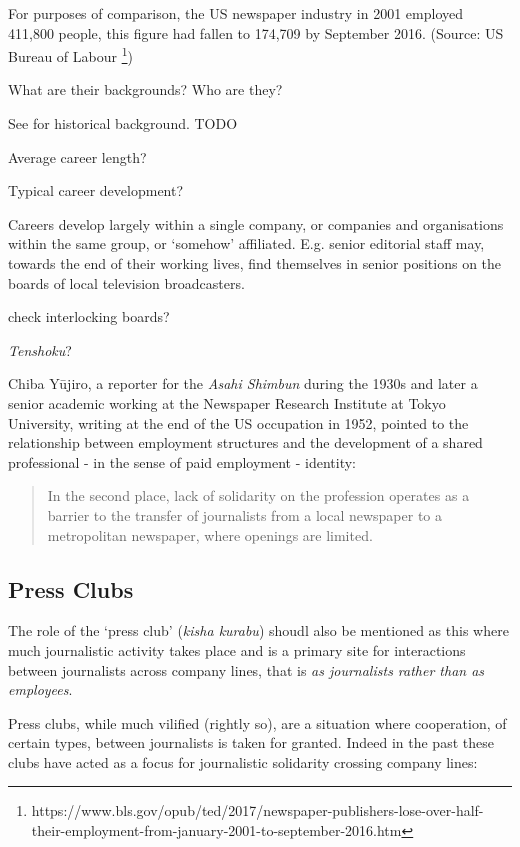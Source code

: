 \documentclass[11pt, headings=normal]{scrartcl}
\begin{document}
For purposes of comparison, the US newspaper industry in 2001 employed
411,800 people, this figure had fallen to 174,709 by September 2016.
(Source: US Bureau of Labour \footnote{https://www.bls.gov/opub/ted/2017/newspaper-publishers-lose-over-half-their-employment-from-january-2001-to-september-2016.htm})

What are their backgrounds? Who are they?

See \textcite{Kawasaki:2006} for historical background. {TODO}

Average career length?

Typical career development?

Careers develop largely within a single company, or companies and
organisations within the same group, or `somehow' affiliated. E.g.
senior editorial staff may, towards the end of their working lives, find
themselves in senior positions on the boards of local television
broadcasters.

{check interlocking boards?}

\textcite{Minami:2011}

\emph{Tenshoku}?

Chiba Yūjiro, a reporter for the \emph{Asahi Shimbun} during the 1930s
and later a senior academic working at the Newspaper Research Institute
at Tokyo University, writing at the end of the US occupation in 1952,
pointed to the relationship between employment structures and the
development of a shared professional - in the sense of paid employment -
identity:

\begin{quote}
In the second place, lack of solidarity on the profession operates as a
barrier to the transfer of journalists from a local newspaper to a
metropolitan newspaper, where openings are limited. \autocite[
326]{Chiba:1952}
\end{quote}

\hypertarget{press-clubs}{%
\subsection{Press Clubs}\label{press-clubs}}

The role of the `press club' (\emph{kisha kurabu}) shoudl also be
mentioned as this where much journalistic activity takes place and is a
primary site for interactions between journalists across company lines,
that is \emph{as journalists rather than as employees}.

Press clubs, while much vilified (rightly so), are a situation where
cooperation, of certain types, between journalists is taken for granted.
Indeed in the past these clubs have acted as a focus for journalistic
solidarity crossing company lines:
\end{document}
